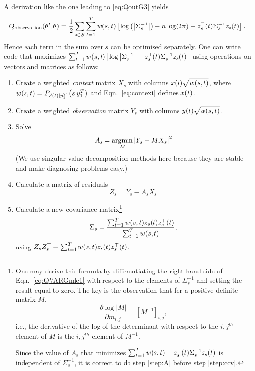 A derivation like the one leading to \eqref{eq:QoutG3} yields
\begin{equation}
  \label{eq:QVARGmle1}
  Q_{\text{observation}} (\parameters',\parameters) =  \frac{1}{2}
      \sum_{s\in\states} \sum_{t=1}^T w(s,t) \left[ \log\left( \left|
      \Sigma_s^{-1} \right| \right) - n
      \log(2\pi) - z_s\transpose(t)
      \Sigma_s^{-1} z_s(t)\right].
\end{equation}
Hence each term in the sum over $s$ can be optimized separately.  One
can write code that maximizes $ \sum_{t=1}^T w(s,t) \left[ \log \left|
    \Sigma_s^{-1} \right| - z_s^\top(t) \Sigma_s^{-1}
  z_s(t)\right]$ using operations on vectors and matrices as
follows:
\begin{enumerate}
\item Create a weighted \emph{context} matrix $X_s$ with columns
  ${x}{(t)}\sqrt{w(s,t)}$, where $w(s,t) =
  P_{{S}{(t)}|y_{1}^{T}} \left(s|y_{1}^{T} \right)$ and
  Eqn.~\eqref{eq:context} defines ${x}{(t)}$.
\item Create a weighted \emph{observation} matrix $Y_s$ with columns
  ${y}{(t)}\sqrt{w(s,t)}$.
\item \label{step:A} Solve
  \begin{equation}
    \label{eq:VARGnewA}
    A_s = \operatorname*{argmin}_M \left|Y_s - MX_s \right|^2
  \end{equation}
  (We use singular value decomposition methods here because they are
  stable and make diagnosing problems easy.)
\item Calculate a matrix of residuals
  \begin{equation*}
    Z_s = Y_s - A_s X_s
  \end{equation*}
\item \label{step:cov} Calculate a new covariance matrix\footnote{One
    may derive this formula by differentiating the right-hand side of
    Eqn.~\ref{eq:QVARGmle1} with respect to the elements of
    $\Sigma_s^{-1}$ and setting the result equal to zero.  The key is
    the observation that for a positive definite matrix $M$,
  \begin{equation*}
    \frac{\partial \log \left| M \right|}{\partial m_{i,j}} =
    \left[M^{-1}\right]_{i,j},
  \end{equation*}
  i.e., the derivative of the log of the determinant with respect to the
  $i,j^{th}$ element of $M$ is the $i,j^{th}$ element of $M^{-1}$.
  
  Since the value of $A_s$ that minimizes $ \sum_{t=1}^T w(s,t) -
  z_s^\top(t) \Sigma_s^{-1} z_s(t)$ is independent of
$\Sigma_s^{-1}$, it is correct to do step \ref{step:A} before step
\ref{step:cov}. }
  \begin{equation}
    \label{eq:VARGnewSigma}
    \Sigma_s = \frac{\sum_{t=1}^T w(s,t) z_s(t)
      z_s^\top(t)}{\sum_{t=1}^T w(s,t)},
  \end{equation}
  using $Z_s Z_s^\top = \sum_{t=1}^T w(s,t) z_s(t)
  z_s^\top(t)$.
\end{enumerate}

